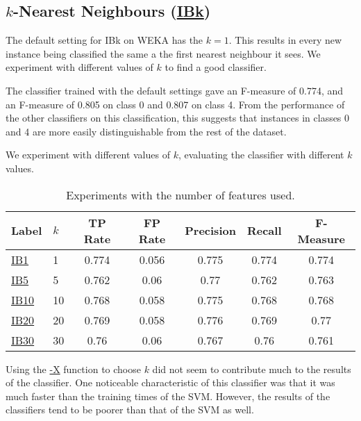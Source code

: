 \documentclass[12pt]{article}
\begin{document}
\subsection{$k$-Nearest Neighbours (\url{IBk})}
The default setting for IBk on WEKA has the $k=1$. This results in every new instance being classified the same a the first nearest neighbour it sees. We experiment with different values of $k$ to find a good classifier.

The classifier trained with the default settings gave an F-measure of 0.774, and an F-measure of 0.805 on class 0 and 0.807 on class 4. From the performance of the other classifiers on this classification, this suggests that instances in classes 0 and 4 are more easily distinguishable from the rest of the dataset.

We experiment with different values of $k$, evaluating the classifier with different $k$ values.
\begin{table}[h]
\linespread{1}
\centering
\begin{tabular}{|l |l|c c c c c|}
\hline
Label & $k$ &	TP Rate & FP Rate & Precision & Recall  & F-Measure	 \\
\hline
\url{IB1}	& 1		&0.774    &  0.056   &    0.775  &    0.774   &   0.774	  \\
\url{IB5}	& 5 	&0.762    &  0.06    &    0.77   &    0.762   &   0.763	  \\   
\url{IB10}  & 10	&0.768    &  0.058   &    0.775  &    0.768   &   0.768	  \\
\url{IB20}	& 20	&0.769    &  0.058   &    0.776  &    0.769   &   0.77 	  \\
\url{IB30}	& 30	&0.76     &  0.06    &    0.767  &    0.76    &   0.761	  \\

\hline
\end{tabular}
\caption{Experiments with the number of features used.}
\label{table:knn}
\end{table}

Using the \url{-X} function to choose $k$ did not seem to contribute much to the results of the classifier. One noticeable characteristic of this classifier was that it was much faster than the training times of the SVM. However, the results of the classifiers tend to be poorer than that of the SVM as well. 
\end{document}
